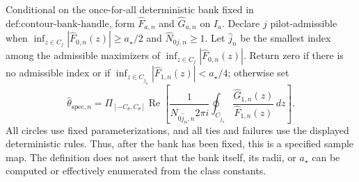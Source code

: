 Conditional on the once-for-all deterministic bank fixed in \(\text{def:contour-bank-handle}\), form \(\widehat F_{a,n}\) and \(\widehat G_{a,n}\) on \(I_a\).  Declare \(j\) pilot-admissible when \(\inf_{z\in C_j}|\widehat F_{0,n}(z)|\ge a_{\star}/2\) and \(\widehat N_{0j,n}\ge1\).  Let \(\widehat j_n\) be the smallest index among the admissible maximizers of \(\inf_{z\in C_j}|\widehat F_{0,n}(z)|\).  Return zero if there is no admissible index or if \(\inf_{z\in C_{\widehat j_n}}|\widehat F_{1,n}(z)|<a_{\star}/4\); otherwise set
\[
 \widehat\theta_{\mathrm{spec},n}
 =\Pi_{[-C_{\theta},C_{\theta}]}
 \operatorname{Re}\!\left[
 \frac{1}{\widehat N_{0\widehat j_n,n}2\pi i}
 \oint_{C_{\widehat j_n}}
 \frac{\widehat G_{1,n}(z)}{\widehat F_{1,n}(z)}\,dz
 \right].
\]
All circles use fixed parameterizations, and all ties and failures use the displayed deterministic rules.  Thus, after the bank has been fixed, this is a specified sample map.  The definition does not assert that the bank itself, its radii, or \(a_{\star}\) can be computed or effectively enumerated from the class constants.